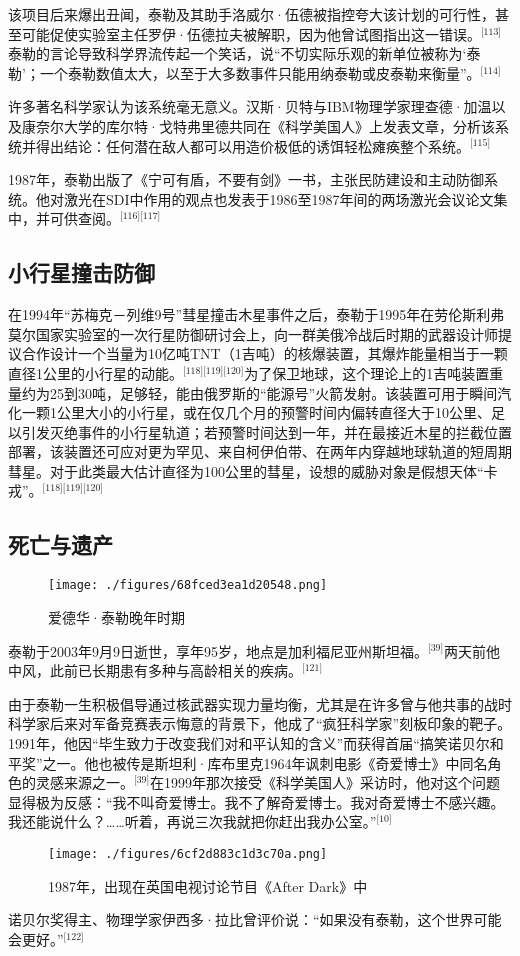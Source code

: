 该项目后来爆出丑闻，泰勒及其助手洛威尔·伍德被指控夸大该计划的可行性，甚至可能促使实验室主任罗伊·伍德拉夫被解职，因为他曾试图指出这一错误。\(^\text{[113]}\)泰勒的言论导致科学界流传起一个笑话，说“不切实际乐观的新单位被称为‘泰勒’；一个泰勒数值太大，以至于大多数事件只能用纳泰勒或皮泰勒来衡量”。\(^\text{[114]}\)

许多著名科学家认为该系统毫无意义。汉斯·贝特与IBM物理学家理查德·加温以及康奈尔大学的库尔特·戈特弗里德共同在《科学美国人》上发表文章，分析该系统并得出结论：任何潜在敌人都可以用造价极低的诱饵轻松瘫痪整个系统。\(^\text{[115]}\)

1987年，泰勒出版了《宁可有盾，不要有剑》一书，主张民防建设和主动防御系统。他对激光在SDI中作用的观点也发表于1986至1987年间的两场激光会议论文集中，并可供查阅。\(^\text{[116][117]}\)
\subsection{小行星撞击防御}
在1994年“苏梅克－列维9号”彗星撞击木星事件之后，泰勒于1995年在劳伦斯利弗莫尔国家实验室的一次行星防御研讨会上，向一群美俄冷战后时期的武器设计师提议合作设计一个当量为10亿吨TNT（1吉吨）的核爆装置，其爆炸能量相当于一颗直径1公里的小行星的动能。\(^\text{[118][119][120]}\)为了保卫地球，这个理论上的1吉吨装置重量约为25到30吨，足够轻，能由俄罗斯的“能源号”火箭发射。该装置可用于瞬间汽化一颗1公里大小的小行星，或在仅几个月的预警时间内偏转直径大于10公里、足以引发灭绝事件的小行星轨道；若预警时间达到一年，并在最接近木星的拦截位置部署，该装置还可应对更为罕见、来自柯伊伯带、在两年内穿越地球轨道的短周期彗星。对于此类最大估计直径为100公里的彗星，设想的威胁对象是假想天体“卡戎”。\(^\text{[118][119][120]}\)
\subsection{死亡与遗产}
\begin{figure}[ht]
\centering
\texttt{[image: ./figures/68fced3ea1d20548.png]}
\caption{爱德华·泰勒晚年时期} \label{fig_ADHTL_16}
\end{figure}
泰勒于2003年9月9日逝世，享年95岁，地点是加利福尼亚州斯坦福。\(^\text{[39]}\)两天前他中风，此前已长期患有多种与高龄相关的疾病。\(^\text{[121]}\)

由于泰勒一生积极倡导通过核武器实现力量均衡，尤其是在许多曾与他共事的战时科学家后来对军备竞赛表示悔意的背景下，他成了“疯狂科学家”刻板印象的靶子。1991年，他因“毕生致力于改变我们对和平认知的含义”而获得首届“搞笑诺贝尔和平奖”之一。他也被传是斯坦利·库布里克1964年讽刺电影《奇爱博士》中同名角色的灵感来源之一。\(^\text{[39]}\)在1999年那次接受《科学美国人》采访时，他对这个问题显得极为反感：“我不叫奇爱博士。我不了解奇爱博士。我对奇爱博士不感兴趣。我还能说什么？……听着，再说三次我就把你赶出我办公室。”\(^\text{[10]}\)
\begin{figure}[ht]
\centering
\texttt{[image: ./figures/6cf2d883c1d3c70a.png]}
\caption{1987年，出现在英国电视讨论节目《After Dark》中} \label{fig_ADHTL_17}
\end{figure}
诺贝尔奖得主、物理学家伊西多·拉比曾评价说：“如果没有泰勒，这个世界可能会更好。”\(^\text{[122]}\)


